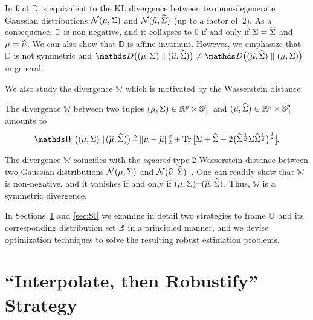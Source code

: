 \documentclass{article}
\begin{document}
In fact $\mathds D$ is equivalent to the KL divergence between two non-degenerate Gaussian distributions $\mathcal N(\mu, \Sigma)$ and $\mathcal N(\widehat {\mu}, \widehat{\Sigma})$ (up to a factor of~2). As a consequence, $\mathds D$ is non-negative, and it collapses to 0 if and only if $\Sigma = \widehat{\Sigma}$ and $\mu = \widehat {\mu}$. We can also show that $\mathds D$ is affine-invariant. However, we emphasize that $\mathds D$ is not symmetric and $\mathds D\big((\m, \cov) \parallel (\msa, \covsa) \big) \neq \mathds D\big((\msa, \covsa) \parallel (\m, \cov) \big)$ in general.

We also study the divergence $\mathds W$ which is motivated by the Wasserstein distance.

\begin{definition} \label{def:Wasserstein}
	The divergence $\mathds W$ between two tuples $(\mu, \Sigma) \in \mathbb{R}^p \times \mathbb{S}_{+}^p$ and $(\widehat {\mu}, \widehat{\Sigma}) \in \mathbb{R}^p \times \mathbb{S}_{+}^p$ amounts to 
	\begin{equation*}
	\mathds W \big( (\m, \cov) \! \parallel \! (\msa, \covsa) \big) \!\Let\!  \| \m - \msa \|_2^2 + \Tr{\cov + \covsa - 2 \big( \covsa^{\half} \cov \covsa^{\half} \big)^{\half} } \!.
	\end{equation*}
\end{definition}
The divergence $\mathds W$ coincides with the \textit{squared} type-$2$ Wasserstein distance between two Gaussian distributions $\mathcal N(\mu, \Sigma)$ and $\mathcal N(\widehat {\mu}, \widehat{\Sigma})$~\cite{ref:givens1984class}. One can readily show that $\mathds W$ is non-negative, and it vanishes if and only if $(\mu, \Sigma)\!\!=\!\!(\widehat {\mu}, \widehat{\Sigma})$. Thus, $\mathds W$ is a symmetric divergence.

In Sections~\ref{sec:IR} and \ref{sec:SI} we examine in detail two strategies to frame $\mathbb U$ and its corresponding distribution set $\mathbb B$ in a principled manner, and we devise optimization techniques to solve the resulting robust estimation problems.

\section{``Interpolate, then Robustify'' Strategy}
\label{sec:IR}
\end{document}
